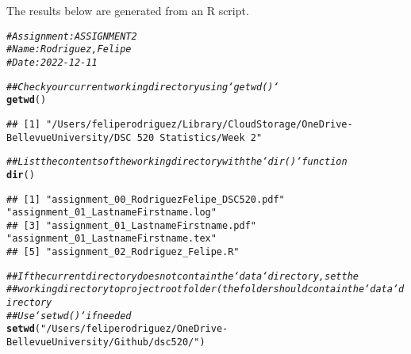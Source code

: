\documentclass{article}\usepackage[]{graphicx}\usepackage[]{xcolor}
\makeatletter
\newcommand{\hlstr}[1]{\textcolor[rgb]{0.192,0.494,0.8}{#1}}%
\newcommand{\hlcom}[1]{\textcolor[rgb]{0.678,0.584,0.686}{\textit{#1}}}%
\newcommand{\hlstd}[1]{\textcolor[rgb]{0.345,0.345,0.345}{#1}}%
\newcommand{\hlkwd}[1]{\textcolor[rgb]{0.737,0.353,0.396}{\textbf{#1}}}%
\newenvironment{kframe}{%
 \def\at@end@of@kframe{}%
 \ifinner\ifhmode%
  \def\at@end@of@kframe{\end{minipage}}%
  \begin{minipage}{\columnwidth}%
 \fi\fi%
 \def\FrameCommand##1{\hskip\@totalleftmargin \hskip-\fboxsep
 \colorbox{shadecolor}{##1}\hskip-\fboxsep
     \hskip-\linewidth \hskip-\@totalleftmargin \hskip\columnwidth}%
 \MakeFramed {\advance\hsize-\width
   \@totalleftmargin\z@ \linewidth\hsize
   \@setminipage}}%
 {\par\unskip\endMakeFramed%
 \at@end@of@kframe}
\newenvironment{knitrout}{}{} %
\makeatother
\begin{document}
\title{\title{\title{\title{\title{\title{\title{\title{}}}}}}}}



\maketitle
The results below are generated from an R script.

\begin{knitrout}
\color{fgcolor}\begin{kframe}
\begin{alltt}
\hlcom{# Assignment: ASSIGNMENT 2}
\hlcom{# Name: Rodriguez, Felipe}
\hlcom{# Date: 2022-12-11}

\hlcom{## Check your current working directory using `getwd()`}
\hlkwd{getwd}\hlstd{()}
\end{alltt}
\begin{verbatim}
## [1] "/Users/feliperodriguez/Library/CloudStorage/OneDrive-BellevueUniversity/DSC 520 Statistics/Week 2"
\end{verbatim}
\begin{alltt}
\hlcom{## List the contents of the working directory with the `dir()` function}
\hlkwd{dir}\hlstd{()}
\end{alltt}
\begin{verbatim}
## [1] "assignment_00_RodriguezFelipe_DSC520.pdf" "assignment_01_LastnameFirstname.log"     
## [3] "assignment_01_LastnameFirstname.pdf"      "assignment_01_LastnameFirstname.tex"     
## [5] "assignment_02_Rodriguez_Felipe.R"
\end{verbatim}
\begin{alltt}
\hlcom{## If the current directory does not contain the `data` directory, set the}
\hlcom{## working directory to project root folder (the folder should contain the `data` directory}
\hlcom{## Use `setwd()` if needed}
\hlkwd{setwd}\hlstd{(}\hlstr{"/Users/feliperodriguez/OneDrive - Bellevue University/Github/dsc520/"}\hlstd{)}


\end{alltt}
\end{kframe}
\end{knitrout}
\end{document}
